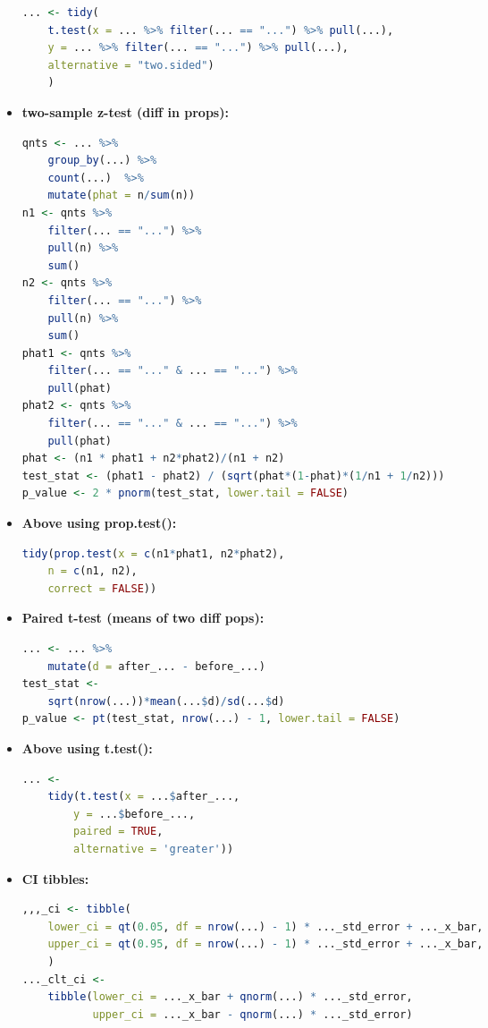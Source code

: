 \documentclass[8pt,landscape,a4paper, fleqn, dvipsnames]{extarticle}
\begin{document}
\begin{multicols*}{4}
\begin{itemize}
\begin{lstlisting}[language = R]
... <- tidy(
    t.test(x = ... %>% filter(... == "...") %>% pull(...), 
    y = ... %>% filter(... == "...") %>% pull(...),
    alternative = "two.sided")
    )
        \end{lstlisting}
    \item \textbf{two-sample z-test (diff in props):}
        \begin{lstlisting}[language = R]
qnts <- ... %>% 
    group_by(...) %>% 
    count(...)  %>% 
    mutate(phat = n/sum(n))
n1 <- qnts %>% 
    filter(... == "...") %>% 
    pull(n) %>% 
    sum()
n2 <- qnts %>% 
    filter(... == "...") %>% 
    pull(n) %>% 
    sum()
phat1 <- qnts %>% 
    filter(... == "..." & ... == "...") %>% 
    pull(phat)
phat2 <- qnts %>% 
    filter(... == "..." & ... == "...") %>%
    pull(phat)
phat <- (n1 * phat1 + n2*phat2)/(n1 + n2)
test_stat <- (phat1 - phat2) / (sqrt(phat*(1-phat)*(1/n1 + 1/n2)))
p_value <- 2 * pnorm(test_stat, lower.tail = FALSE)
        \end{lstlisting}
        \item \textbf{Above using prop.test():}
        \begin{lstlisting}[language = R] 
tidy(prop.test(x = c(n1*phat1, n2*phat2), 
    n = c(n1, n2), 
    correct = FALSE))
        \end{lstlisting}
        \item \textbf{Paired t-test (means of two diff pops):}
        \begin{lstlisting}[language = R]
... <- ... %>% 
    mutate(d = after_... - before_...)
test_stat <- 
    sqrt(nrow(...))*mean(...$d)/sd(...$d)
p_value <- pt(test_stat, nrow(...) - 1, lower.tail = FALSE)
        \end{lstlisting}
        \item \textbf{Above using t.test():}
        \begin{lstlisting}[language = R]
... <- 
    tidy(t.test(x = ...$after_..., 
        y = ...$before_..., 
        paired = TRUE,
        alternative = 'greater'))
        \end{lstlisting}
        \item \textbf{CI tibbles:}
        \begin{lstlisting}[language = R]
,,,_ci <- tibble(
    lower_ci = qt(0.05, df = nrow(...) - 1) * ..._std_error + ..._x_bar,
    upper_ci = qt(0.95, df = nrow(...) - 1) * ..._std_error + ..._x_bar,
    )
..._clt_ci <- 
    tibble(lower_ci = ..._x_bar + qnorm(...) * ..._std_error, 
           upper_ci = ..._x_bar - qnorm(...) * ..._std_error)
        \end{lstlisting}

\end{itemize}
\end{multicols*}
\end{document}
